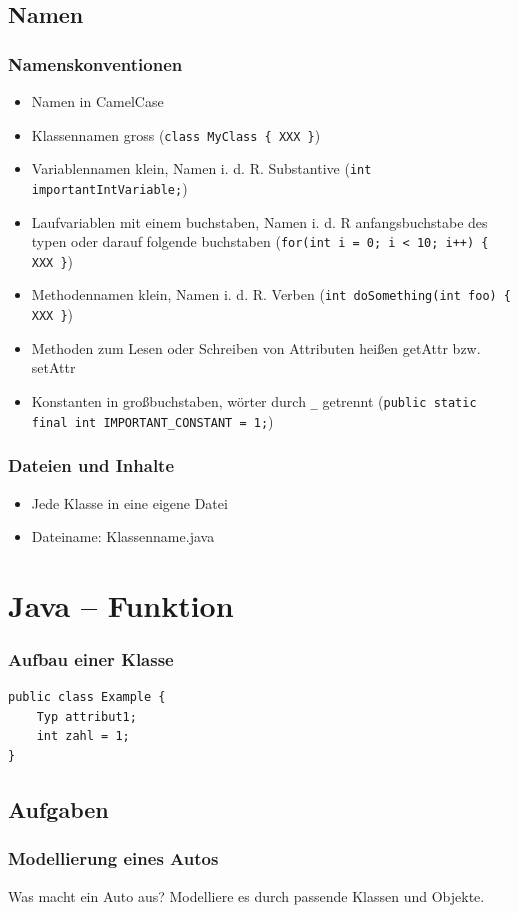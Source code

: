 \documentclass{beamer}
\begin{document}
\subsection{Namen}
\begin{frame}[fragile]
    \frametitle{Namenskonventionen}
    \begin{itemize}
        \item Namen in CamelCase
        \item Klassennamen gross (\verb|class MyClass { XXX }|)
        \item Variablennamen klein, Namen i. d. R. Substantive (\verb|int importantIntVariable;|)
        \item Laufvariablen mit einem buchstaben, Namen i. d. R anfangsbuchstabe des
            typen oder darauf folgende buchstaben (\verb|for(int i = 0; i < 10; i++) { XXX }|)
        \item Methodennamen klein, Namen i. d. R. Verben (\verb|int doSomething(int foo) { XXX }|)
        \item Methoden zum Lesen oder Schreiben von Attributen hei\ss{}en getAttr bzw. setAttr
        \item Konstanten in gro\ss{}buchstaben, w\"{o}rter durch \verb|_|
            getrennt (\verb|public static final int IMPORTANT_CONSTANT = 1;|)
    \end{itemize}
\end{frame}

\begin{frame}
    \frametitle{Dateien und Inhalte}
    \begin{itemize}
        \item Jede Klasse in eine eigene Datei
        \item Dateiname: Klassenname.java
    \end{itemize}
\end{frame}

\section{Java -- Funktion}
\begin{frame}[fragile]
\frametitle{Aufbau einer Klasse}
\begin{verbatim}
public class Example {
    Typ attribut1;
    int zahl = 1;
}
\end{verbatim}
\end{frame}

\subsection{Aufgaben}
\begin{frame}
\frametitle{Modellierung eines Autos}
Was macht ein Auto aus? Modelliere es durch passende Klassen und Objekte.
\end{frame}
\end{document}
